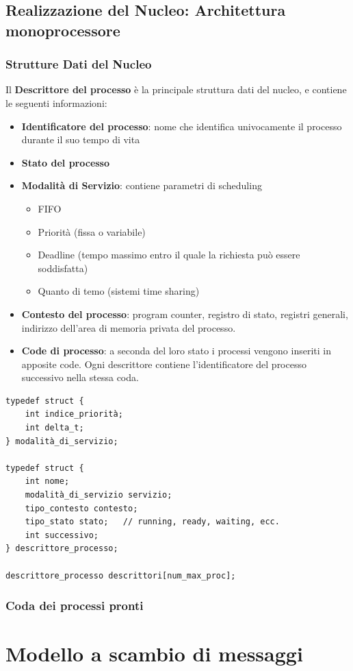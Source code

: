 \documentclass{article}
\begin{document}
\subsection{Realizzazione del Nucleo: Architettura monoprocessore}

\subsubsection{Strutture Dati del Nucleo}

Il \textbf{Descrittore del processo} è la principale struttura dati del nucleo, e contiene le seguenti informazioni:
\begin{itemize}
    \item \textbf{Identificatore del processo}: nome che identifica univocamente il processo durante il suo tempo di vita
    \item \textbf{Stato del processo}
    \item \textbf{Modalità di Servizio}: contiene parametri di scheduling
    \begin{itemize}
        \item FIFO
        \item Priorità (fissa o variabile)
        \item Deadline (tempo massimo entro il quale la richiesta può essere soddisfatta)
        \item Quanto di temo (sistemi time sharing)
    \end{itemize}
    \item \textbf{Contesto del processo}: program counter, registro di stato, registri generali, indirizzo dell'area di memoria privata del processo.
    \item \textbf{Code di processo}: a seconda del loro stato i processi vengono inseriti in apposite code. Ogni descrittore contiene l'identificatore del processo successivo 
    nella stessa coda.
\end{itemize}

\begin{lstlisting}[caption={Realizzazione desctittore del processo},captionpos=b]
typedef struct {
    int indice_priorità;
    int delta_t;
} modalità_di_servizio;

typedef struct {
    int nome;
    modalità_di_servizio servizio;
    tipo_contesto contesto;
    tipo_stato stato;   // running, ready, waiting, ecc.
    int successivo;
} descrittore_processo;

descrittore_processo descrittori[num_max_proc];
\end{lstlisting}

\subsubsection{Coda dei processi pronti}





\section{Modello a scambio di messaggi}
\end{document}
